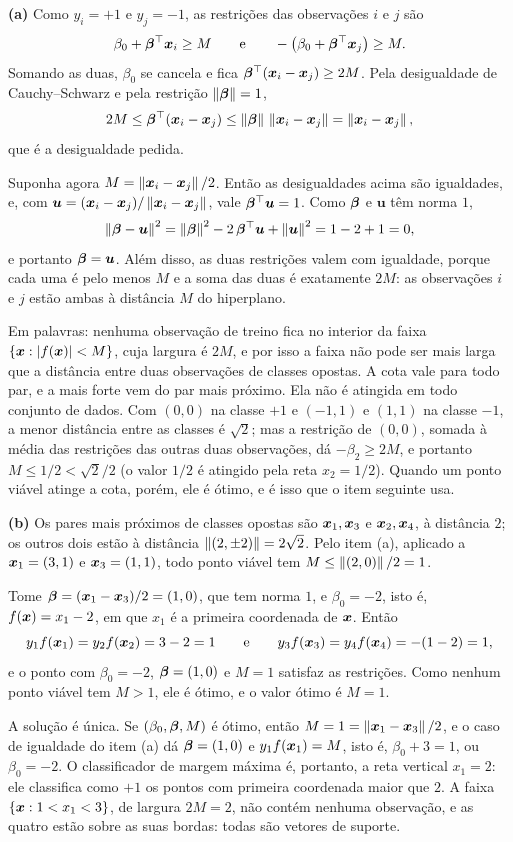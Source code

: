 \documentclass[11pt,a4paper]{article}
\begin{document}
\begin{solucao}
\textbf{(a)} Como $y_i=+1$ e $y_j=-1$, as restrições das observações $i$ e $j$ são
\[
  \beta_0+\bm{\beta}^\top\bm{x}_i\ge M
  \qquad\text{e}\qquad
  -\big(\beta_0+\bm{\beta}^\top\bm{x}_j\big)\ge M .
\]
Somando as duas, $\beta_0$ se cancela e fica $\bm{\beta}^\top(\bm{x}_i-\bm{x}_j)\ge 2M$. Pela
desigualdade de Cauchy--Schwarz e pela restrição $\left\lVert \bm{\beta} \right\rVert=1$,
\[
  2M\le\bm{\beta}^\top(\bm{x}_i-\bm{x}_j)\le\left\lVert \bm{\beta} \right\rVert\,\left\lVert \bm{x}_i-\bm{x}_j \right\rVert=\left\lVert \bm{x}_i-\bm{x}_j \right\rVert,
\]
que é a desigualdade pedida.

Suponha agora $M=\left\lVert \bm{x}_i-\bm{x}_j \right\rVert/2$. Então as desigualdades acima são igualdades, e,
com $\bm u=(\bm{x}_i-\bm{x}_j)/\left\lVert \bm{x}_i-\bm{x}_j \right\rVert$, vale $\bm{\beta}^\top\bm u=1$. Como $\bm{\beta}$ e
$\bm u$ têm norma $1$,
\[
  \left\lVert \bm{\beta}-\bm u \right\rVert^2=\left\lVert \bm{\beta} \right\rVert^2-2\,\bm{\beta}^\top\bm u+\left\lVert \bm u \right\rVert^2=1-2+1=0,
\]
e portanto $\bm{\beta}=\bm u$. Além disso, as duas restrições valem com igualdade, porque
cada uma é pelo menos $M$ e a soma das duas é exatamente $2M$: as observações $i$ e
$j$ estão ambas à distância $M$ do hiperplano.

Em palavras: nenhuma observação de treino fica no interior da faixa
$\{\bm{x}:\left\lvert f(\bm{x}) \right\rvert<M\}$, cuja largura é $2M$, e por isso a faixa não pode ser mais larga
que a distância entre duas observações de classes opostas. A cota vale para todo par,
e a mais forte vem do par mais próximo. Ela não é atingida em todo conjunto de dados.
Com $(0,0)$ na classe $+1$ e $(-1,1)$ e $(1,1)$ na classe $-1$, a menor distância entre
as classes é $\sqrt2$; mas a restrição de $(0,0)$, somada à média das restrições das
outras duas observações, dá $-\beta_2\ge2M$, e portanto $M\le1/2<\sqrt2/2$ (o valor
$1/2$ é atingido pela reta $x_2=1/2$). Quando um ponto viável atinge a cota, porém, ele
é ótimo, e é isso que o item seguinte usa.

\smallskip
\textbf{(b)} Os pares mais próximos de classes opostas são $\bm{x}_1,\bm{x}_3$ e $\bm{x}_2,\bm{x}_4$,
à distância $2$; os outros dois estão à distância $\left\lVert (2,\pm2) \right\rVert=2\sqrt2$. Pelo item
(a), aplicado a $\bm{x}_1=(3,1)$ e $\bm{x}_3=(1,1)$, todo ponto viável tem
$M\le\left\lVert (2,0) \right\rVert/2=1$.

Tome $\bm{\beta}=(\bm{x}_1-\bm{x}_3)/2=(1,0)$, que tem norma $1$, e $\beta_0=-2$, isto é,
$f(\bm{x})=x_1-2$, em que $x_1$ é a primeira coordenada de $\bm{x}$. Então
\[
  y_1f(\bm{x}_1)=y_2f(\bm{x}_2)=3-2=1
  \qquad\text{e}\qquad
  y_3f(\bm{x}_3)=y_4f(\bm{x}_4)=-(1-2)=1,
\]
e o ponto com $\beta_0=-2$, $\bm{\beta}=(1,0)$ e $M=1$ satisfaz as restrições. Como nenhum
ponto viável tem $M>1$, ele é ótimo, e o valor ótimo é $M=1$.

A solução é única. Se $(\beta_0,\bm{\beta},M)$ é ótimo, então $M=1=\left\lVert \bm{x}_1-\bm{x}_3 \right\rVert/2$, e o
caso de igualdade do item (a) dá $\bm{\beta}=(1,0)$ e $y_1f(\bm{x}_1)=M$, isto é,
$\beta_0+3=1$, ou $\beta_0=-2$. O classificador de margem máxima é, portanto, a reta
vertical $x_1=2$: ele classifica como $+1$ os pontos com primeira coordenada maior que
$2$. A faixa $\{\bm{x}:1<x_1<3\}$, de largura $2M=2$, não contém nenhuma observação, e as
quatro estão sobre as suas bordas: todas são vetores de suporte.


\end{solucao}
\end{document}
